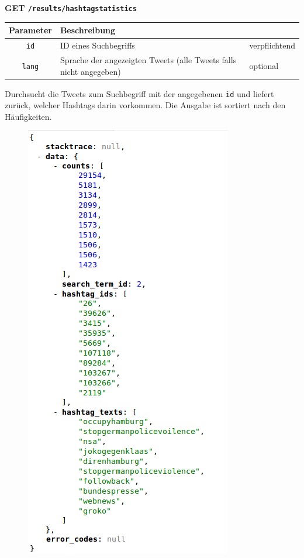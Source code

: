 \noindent
\textbf{GET \texttt{/results/hashtagstatistics}}
\begin{table}[h!]
\begin{tabular}{| c | p{\tweite} | l |}
\hline
	\textbf{Parameter} & \textbf{Beschreibung} &  \\
\hline \hline
 	\texttt{id} & ID eines Suchbegriffs & verpflichtend \\
\hline
 	\texttt{lang} & Sprache der angezeigten Tweets (alle Tweets falls nicht angegeben) & optional \\
\hline
\end{tabular}
\end{table}
\newline
Durchsucht die Tweets zum Suchbegriff mit der angegebenen \texttt{id} und liefert zurück, welcher Hashtags darin vorkommen. Die Ausgabe ist sortiert nach den Häufigkeiten.
\begin{figure}[h!]
\includegraphics[scale=0.6]{Bilder/RestApi/resultsHashtagStatistics.png}
\end{figure}